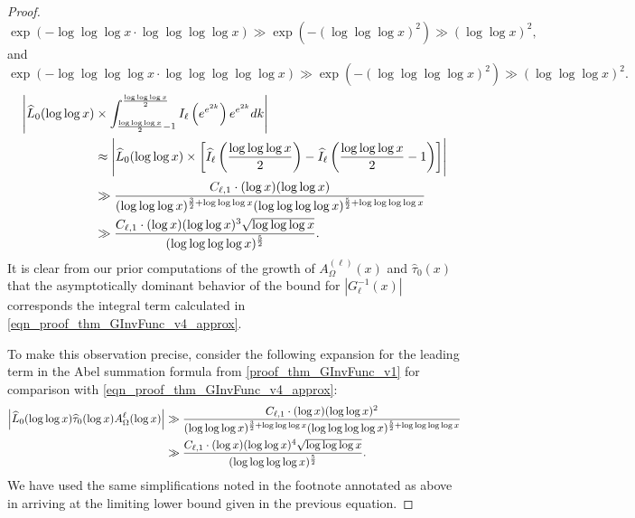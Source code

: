 \documentclass[11pt,reqno,a4letter]{article}
\numberwithin{figure}{section}
\numberwithin{table}{section}
\theoremstyle{plain}
\numberwithin{theorem}{section}
\theoremstyle{definition}
\newcommand{\SuccSim}[0]{\overset{_{\scriptsize{\blacktriangle}}}{\succsim}}
\renewcommand{\SuccSim}[0]{\ensuremath{\gg}}
\begin{document}
\begin{proof}
{     \[
     \exp\left(-\log\log\log x \cdot \log\log\log\log x\right) \SuccSim 
          \exp\left(-(\log\log\log x)^2\right) \SuccSim 
          (\log\log x)^2,  
     \]
     and 
     \[
     \exp\left(-\log\log\log\log x \cdot \log\log\log\log\log x\right) \SuccSim 
          \exp\left(-(\log\log\log\log x)^2\right) \SuccSim 
          (\log\log\log x)^2.  
     \]
} 
\begin{align} 
\notag 
\Biggl\lvert \widehat{L}_0(\log\log x) & 
     \times \int_{\frac{\log\log\log x}{2}-1}^{\frac{\log\log\log x}{2}} 
     I_{\ell}\left(e^{e^{2k}}\right) 
     e^{e^{2k}} dk \Biggr\rvert \\ 
\notag 
     & \approx \Biggl\lvert \widehat{L}_0(\log\log x) \times \left[ 
     \widehat{I}_{\ell}\left(\frac{\log\log\log x}{2}\right) - 
     \widehat{I}_{\ell}\left(\frac{\log\log\log x}{2}-1\right)
     \right] \Biggr\rvert \\ 
\notag 
     & \gg \frac{C_{\ell,1} \cdot (\log x) (\log\log x)}{(\log\log\log x)^{\frac{3}{2} + \log\log\log x} 
     (\log\log\log\log x)^{\frac{5}{2} + \log\log\log\log x}} \\ 
\label{eqn_proof_thm_GInvFunc_v4_approx} 
     & \SuccSim 
     \frac{C_{\ell,1} \cdot (\log x) (\log\log x)^{3} \sqrt{\log\log\log x}}{ 
     (\log\log\log\log x)^{\frac{5}{2}}}. 
\end{align} 
It is clear from our prior computations of the growth of 
$A_{\Omega}^{(\ell)}(x)$ and $\widehat{\tau}_0(x)$ 
that the asymptotically dominant behavior of the bound for 
$|G_{\ell}^{-1}(x)|$ corresponds the integral term calculated in 
\eqref{eqn_proof_thm_GInvFunc_v4_approx}. 

To make this observation precise, consider the following expansion for the leading term in 
the Abel summation formula from \eqref{proof_thm_GInvFunc_v1} for comparison with 
\eqref{eqn_proof_thm_GInvFunc_v4_approx}: 
\begin{align} 
\notag 
\left\lvert \widehat{L}_0(\log\log x) \widehat{\tau}_0(\log x) A_{\Omega}^{\ell}(\log x) \right\rvert 
\notag 
     & \gg \frac{C_{\ell,1} \cdot (\log x) (\log\log x)^2}{(\log\log\log x)^{\frac{3}{2} + \log\log\log x} 
     (\log\log\log\log x)^{\frac{5}{2} + \log\log\log\log x}} \\ 
\label{eqn_proof_thm_GInvFunc_v5_approx} 
     & \SuccSim 
     \frac{C_{\ell,1} \cdot (\log x) (\log\log x)^{4} \sqrt{\log\log\log x}}{ 
     (\log\log\log\log x)^{\frac{5}{2}}}. 
\end{align} 
We have used the same simplifications noted in the footnote annotated as above in arriving at the 
limiting lower bound given in the previous equation. 
\end{proof} 
\end{document}
